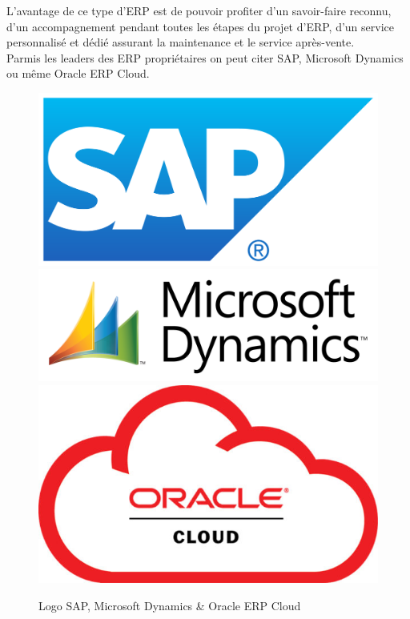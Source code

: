     L'avantage de ce type d'\acs{ERP} est de pouvoir profiter d'un savoir-faire reconnu, d'un accompagnement pendant toutes les étapes du projet d'ERP, d'un service personnalisé et dédié assurant la maintenance et le service après-vente.\\

    Parmis les leaders des \acs{ERP} propriétaires on peut citer SAP\cite{sap}, Microsoft Dynamics\cite{ms-dynamics} ou même Oracle \acs{ERP} Cloud\cite{oracle}.

    \begin{figure}[H]
        \centering
        \includegraphics[scale=0.03]{ERP/SAP_logo.png}
        \includegraphics[scale=0.3]{ERP/MS-Dynamics-Logopng.png}
        \includegraphics[scale=0.2]{ERP/Oracle_Cloud_logo.jpg}
        \caption{Logo SAP, Microsoft Dynamics \& Oracle \acs{ERP} Cloud}
    \end{figure}

